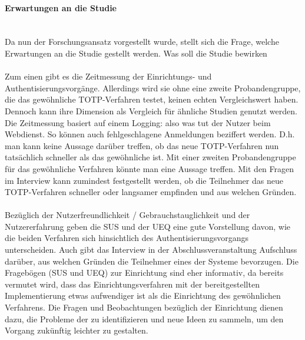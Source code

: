 \paragraph*{Erwartungen an die Studie}
\mbox{} \vspace{0.1cm} \\
Da nun der Forschungsansatz vorgestellt wurde, stellt sich die Frage, welche 
Erwartungen an die Studie gestellt werden. Was soll die Studie bewirken
\\\\
Zum einen gibt es die Zeitmessung der Einrichtungs- und 
Authentisierungsvorgänge. Allerdings wird sie ohne eine zweite Probandengruppe, 
die das gewöhnliche TOTP-Verfahren testet, keinen echten Vergleichswert haben. 
Dennoch kann ihre Dimension als Vergleich für ähnliche Studien genutzt werden. 
Die Zeitmessung basiert auf einem Logging: also was tut der Nutzer beim 
Webdienst. So können auch fehlgeschlagene Anmeldungen beziffert werden. D.h. man 
kann keine Aussage darüber treffen, ob das neue TOTP-Verfahren nun tatsächlich 
schneller als das gewöhnliche ist. Mit einer zweiten Probandengruppe für das 
gewöhnliche Verfahren könnte man eine Aussage treffen. Mit den 
Fragen im Interview kann zumindest festgestellt werden, ob die Teilnehmer das 
neue TOTP-Verfahren schneller oder langsamer empfinden und aus welchen Gründen.
\\\\
Bezüglich der Nutzerfreundlichkeit / Gebrauchstauglichkeit und der 
Nutzererfahrung geben die SUS und der UEQ eine gute Vorstellung davon, wie die 
beiden Verfahren sich hinsichtlich des Authentisierungsvorgangs unterscheiden. 
Auch gibt das Interview in der Abschlussveranstaltung Aufschluss darüber, aus 
welchen Gründen die Teilnehmer eines der Systeme bevorzugen. Die Fragebögen (SUS 
und UEQ) zur Einrichtung sind eher informativ, da bereits vermutet wird, dass das 
Einrichtungsverfahren mit der bereitgestellten Implementierung etwas aufwendiger 
ist als die Einrichtung des gewöhnlichen Verfahrens. Die Fragen 
und Beobachtungen bezüglich der Einrichtung dienen dazu, die Probleme der zu 
identifizieren und neue Ideen zu sammeln, um den Vorgang zukünftig leichter 
zu gestalten.
